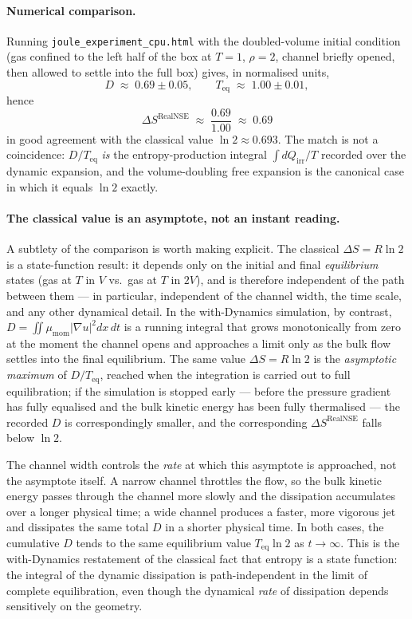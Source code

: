 \paragraph{Numerical comparison.}
Running \texttt{joule\_experiment\_cpu.html} with the doubled-volume
initial condition (gas confined to the left half of the box at
$T=1$, $\rho=2$, channel briefly opened, then allowed to settle into
the full box) gives, in normalised units,
\[
  D \;\approx\; 0.69 \pm 0.05, \qquad
  T_{\mathrm{eq}} \;\approx\; 1.00 \pm 0.01,
\]
hence
\[
  \Delta S^{\mathrm{RealNSE}}
    \;\approx\; \frac{0.69}{1.00}
    \;\approx\; 0.69
\]
in good agreement with the classical value $\ln 2 \approx 0.693$. The
match is not a coincidence: $D/T_{\mathrm{eq}}$ \emph{is} the
entropy-production integral $\int dQ_{\mathrm{irr}}/T$ recorded over
the dynamic expansion, and the volume-doubling free expansion is the
canonical case in which it equals $\ln 2$ exactly.

\paragraph{The classical value is an asymptote, not an instant reading.}
A subtlety of the comparison is worth making explicit. The classical
$\Delta S = R\ln 2$ is a state-function result: it depends only on the
initial and final \emph{equilibrium} states (gas at $T$ in $V$ vs.\ gas
at $T$ in $2V$), and is therefore independent of the path between them
--- in particular, independent of the channel width, the time scale,
and any other dynamical detail. In the with-Dynamics simulation, by
contrast, $D = \iint\mu_{\mathrm{mom}}|\nabla u|^2 dx\,dt$ is a
running integral that grows monotonically from zero at the moment the
channel opens and approaches a limit only as the bulk flow settles
into the final equilibrium. The same value $\Delta S = R\ln 2$ is the
\emph{asymptotic maximum} of $D/T_{\mathrm{eq}}$, reached when the
integration is carried out to full equilibration; if the simulation is
stopped early --- before the pressure gradient has fully equalised and
the bulk kinetic energy has been fully thermalised --- the recorded $D$
is correspondingly smaller, and the corresponding $\Delta S^{\mathrm{RealNSE}}$
falls below $\ln 2$.

The channel width controls the \emph{rate} at which this asymptote is
approached, not the asymptote itself. A narrow channel throttles the
flow, so the bulk kinetic energy passes through the channel more slowly
and the dissipation accumulates over a longer physical time; a wide
channel produces a faster, more vigorous jet and dissipates the same
total $D$ in a shorter physical time. In both cases, the cumulative
$D$ tends to the same equilibrium value $T_{\mathrm{eq}} \ln 2$ as
$t \to \infty$. This is the with-Dynamics restatement of the classical
fact that entropy is a state function: the integral of the dynamic
dissipation is path-independent in the limit of complete equilibration,
even though the dynamical \emph{rate} of dissipation depends sensitively
on the geometry.

